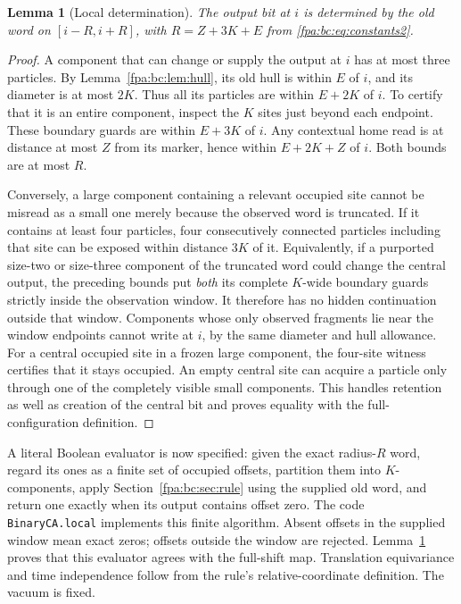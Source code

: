 \documentclass[11pt,a4paper]{article}
\numberwithin{equation}{section}
\newtheorem{lemma}[theorem]{Lemma}
\begin{document}
\begin{lemma}[Local determination]\label{fpa:bc:lem:local}
The output bit at $i$ is determined by the old word on $[i-R,i+R]$, with
$R=Z+3K+E$ from \eqref{fpa:bc:eq:constants2}.
\end{lemma}
\begin{proof}
A component that can change or supply the output at $i$ has at most three
particles. By Lemma~\ref{fpa:bc:lem:hull}, its old hull is within $E$ of $i$, and its
diameter is at most $2K$. Thus all its particles are within $E+2K$ of $i$.
To certify that it is an entire component, inspect the $K$ sites just beyond
each endpoint. These boundary guards are within $E+3K$ of $i$. Any contextual
home read is at distance at most $Z$ from its marker, hence within $E+2K+Z$
of $i$. Both bounds are at most $R$.

Conversely, a large component containing a relevant occupied site cannot be
misread as a small one merely because the observed word is truncated.
If it contains at least four particles, four consecutively connected
particles including that site can be exposed within distance $3K$ of it.
Equivalently, if a purported size-two or size-three component of the truncated
word could change the central output, the preceding bounds put \emph{both}
its complete $K$-wide boundary guards strictly inside the observation window.
It therefore has no hidden continuation outside that window. Components whose
only observed fragments lie near the window endpoints cannot write at $i$,
by the same diameter and hull allowance. For a central occupied site in a
frozen large component, the four-site witness certifies that it stays occupied.
An empty central site can acquire a particle only through one of the completely
visible small components. This handles retention as well as creation of the
central bit and proves equality with the full-configuration definition.
\end{proof}

A literal Boolean evaluator is now specified: given the exact radius-$R$ word,
regard its ones as a finite set of occupied offsets, partition them into
$K$-components, apply Section~\ref{fpa:bc:sec:rule} using the supplied old word, and
return one exactly when its output contains offset zero. The code
\texttt{BinaryCA.local} implements this finite algorithm. Absent offsets in
the supplied window mean exact zeros; offsets outside the window are rejected.
Lemma~\ref{fpa:bc:lem:local} proves that this evaluator agrees with the full-shift
map. Translation equivariance and time independence follow from the rule's
relative-coordinate definition. The vacuum is fixed.
\end{document}
